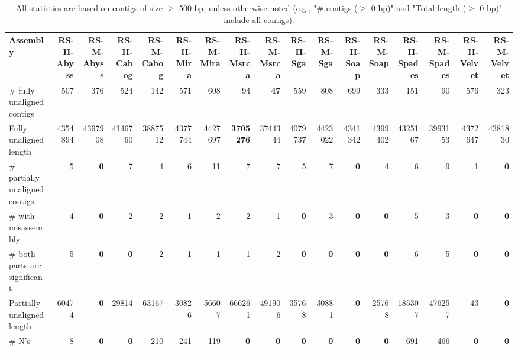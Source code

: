 \documentclass[12pt,a4paper]{article}
\begin{document}
\begin{table}[ht]
\begin{center}
\caption{All statistics are based on contigs of size $\geq$ 500 bp, unless otherwise noted (e.g., "\# contigs ($\geq$ 0 bp)" and "Total length ($\geq$ 0 bp)" include all contigs).}
\begin{tabular}{|l*{16}{|r}|}
\hline
Assembly & RS-H-Abyss & RS-M-Abyss & RS-H-Cabog & RS-M-Cabog & RS-H-Mira & RS-M-Mira & RS-H-Msrca & RS-M-Msrca & RS-H-Sga & RS-M-Sga & RS-H-Soap & RS-M-Soap & RS-H-Spades & RS-M-Spades & RS-H-Velvet & RS-M-Velvet \\ \hline
\# fully unaligned contigs & 507 & 376 & 524 & 142 & 571 & 608 & 94 & {\bf 47} & 559 & 808 & 699 & 333 & 151 & 90 & 576 & 323 \\ \hline
Fully unaligned length & 4354894 & 4397908 & 4146760 & 3887512 & 4377744 & 4427697 & {\bf 3705276} & 3744344 & 4079737 & 4423022 & 4341342 & 4399402 & 4325167 & 3993153 & 4372647 & 4381830 \\ \hline
\# partially unaligned contigs & 5 & {\bf 0} & 7 & 4 & 6 & 11 & 7 & 7 & 5 & 7 & {\bf 0} & 4 & 6 & 9 & 1 & {\bf 0} \\ \hline
\hspace{5mm}\# with misassembly & 4 & {\bf 0} & 2 & 2 & 1 & 2 & 2 & 1 & {\bf 0} & 3 & {\bf 0} & {\bf 0} & 5 & 3 & {\bf 0} & {\bf 0} \\ \hline
\hspace{5mm}\# both parts are significant & 5 & {\bf 0} & {\bf 0} & 2 & 1 & 1 & 1 & 2 & {\bf 0} & {\bf 0} & {\bf 0} & {\bf 0} & 6 & 5 & {\bf 0} & {\bf 0} \\ \hline
Partially unaligned length & 60474 & {\bf 0} & 29814 & 63167 & 30826 & 56607 & 666261 & 491906 & 35768 & 30881 & {\bf 0} & 25768 & 185307 & 476257 & 43 & {\bf 0} \\ \hline
\# N's & 8 & {\bf 0} & {\bf 0} & 210 & 241 & 119 & {\bf 0} & {\bf 0} & {\bf 0} & {\bf 0} & {\bf 0} & {\bf 0} & 691 & 466 & {\bf 0} & {\bf 0} \\ \hline
\end{tabular}
\end{center}
\end{table}
\end{document}
